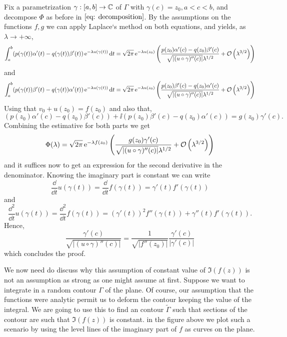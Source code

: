\begin{Mproof}
	Fix a parametrization $\gamma : [a,b] \rightarrow \mathbb{C}$ of $\Gamma$ with $\gamma(c) = z_0, a < c < b$, and decompose $\Phi$ as before in $\ref{eq: decomposition}$. By the assumptions on the functions $f, g$ we can apply Laplace`s method on both equations, and yields, as $\lambda \rightarrow + \infty$,
	$$\int_{a}^{b} (p(\gamma(t))\alpha'(t)-q(\gamma(t))\beta'(t)) \operatorname{e}^{-\lambda u(\gamma(t))} \mathrm{d} t = \sqrt{2\pi} \operatorname{e}^{-\lambda u(z_0)} \left( \frac{p(z_0)\alpha'(c)-q(z_0)\beta'(c)}{\sqrt{|(u \circ \gamma)''(c)|} \lambda^{1/2}} + \mathcal{O} \left(\lambda^{3/2}\right) \right)$$
	and
	$$\int_{a}^{b} (p(\gamma(t))\beta'(t)-q(\gamma(t))\alpha'(t)) \operatorname{e}^{-\lambda u(\gamma(t))} \mathrm{d} t = \sqrt{2\pi} \operatorname{e}^{-\lambda u(z_0)} \left( \frac{p(z_0)\beta'(c)-q(z_0)\alpha'(c)}{\sqrt{|(u \circ \gamma)''(c)|} \lambda^{1/2}} + \mathcal{O} \left(\lambda^{3/2}\right) \right)$$
	Using that $v_0 + u(z_0) = f(z_0)$ and also that,
	$$ (p(z_0)\alpha'(c)-q(z_0)\beta'(c)) + \ii (p(z_0)\beta'(c)-q(z_0)\alpha'(c)) = g(z_0)\gamma'(c).$$
	Combining the estimative for both parts we get
	$$\Phi(\lambda) = \sqrt{2\pi} \operatorname{e}^{-\lambda f(z_0)} \left( \frac{g(z_0)\gamma'(c)}{\sqrt{|(u \circ \gamma)''(c)|} \lambda^{1/2}} + \mathcal{O} \left(\lambda^{3/2}\right) \right)$$ 
	and it suffices now to get an expression for the second derivative in the denominator. Knowing the imaginary part is constant we can write
	$$\frac{\dd}{\dd t} u(\gamma(t)) = \frac{\dd}{\dd t} f(\gamma(t)) = \gamma'(t) f'(\gamma(t))$$
	and
	$$ \frac{\dd^2}{\dd t} u(\gamma(t)) = \frac{\dd^2}{\dd t} f(\gamma(t)) = (\gamma'(t))^2 f''(\gamma(t)) + \gamma''(t) f'(\gamma(t)).$$
	Hence,
	$$ \frac{\gamma'(c)}{\sqrt{|(u \circ \gamma)''(c)|}} = \frac{1}{\sqrt{|f''(z_0)|}} \frac{\gamma'(c)}{|\gamma'(c)|}$$
	which concludes the proof.
\end{Mproof}

We now need do discuss why this assumption of constant value of $\Im(f(z))$ is not an assumption as strong as one might assume at first. Suppose we want to integrate in a random contour $\Gamma$ of the plane. Of course, our assumption that the functions were analytic permit us to deform the contour keeping the value of the integral. We are going to use this to find an contour $\tilde{\Gamma}$ such that sections of the contour are such that $\Im(f(z))$ is constant. in the figure above we plot such a scenario by using the level lines of the imaginary part of $f$ as curves on the plane. 

